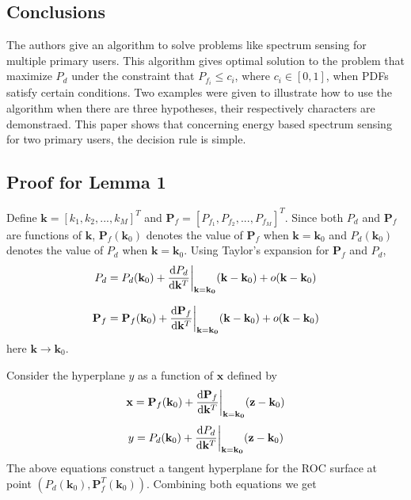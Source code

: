 \documentclass[12pt,journal,a4paper,twoside,onecolumn]{IEEEtran}
\begin{document}
\begin{spacing}{2.5}
\section{Conclusions}
The authors give an algorithm to solve problems like spectrum sensing for multiple primary users.
This algorithm gives optimal solution to the problem that maximize $P_d$ under the constraint that $P_{f_i} \leq c_i$, where $c_i \in [0, 1]$, when PDFs satisfy certain conditions.
Two examples were given to illustrate how to use the algorithm when there are three hypotheses, their respectively characters are demonstraed.
This paper shows that concerning energy based spectrum sensing for two primary users, the decision rule is simple.


\appendix
\subsection{Proof for Lemma 1}

Define $\mathbf{k} = [k_1, k_2, ..., k_M]^T$ and $\mathbf{P}_f = [P_{f_1}, P_{f_2}, ..., P_{f_M}]^T$. Since both $P_d$ and $\mathbf{P}_f$ are functions of $\mathbf{k}$, $\mathbf{P}_f(\mathbf{k}_0)$ denotes the value of $\mathbf{P}_f$ when $\mathbf{k} = \mathbf{k}_0$ and $P_d(\mathbf{k}_0)$ denotes the value of $P_d$ when $\mathbf{k} = \mathbf{k}_0$. Using Taylor's expansion for $\mathbf{P}_f$ and $P_d$,
\begin{equation}
\label{pro: pd}
P_d = P_d(\mathbf{k}_0) + \frac{\mathrm{d}P_d}{\mathrm{d}\mathbf{k}^T}\bigg{|}_{\mathbf{k}=\mathbf{k_0}}(\mathbf{k} - \mathbf{k}_0)
+ o(\mathbf{k} - \mathbf{k}_0)
\end{equation}

\begin{equation}
\label{pro: pf}
\mathbf{P}_f = \mathbf{P}_f(\mathbf{k}_0) + \frac{\mathrm{d}\mathbf{P}_f}{\mathrm{d}\mathbf{k}^T}\bigg{|}_{\mathbf{k}=\mathbf{k_0}}(\mathbf{k} - \mathbf{k}_0)
+ o(\mathbf{k} - \mathbf{k}_0)
\end{equation}
here $\mathbf{k} \rightarrow \mathbf{k}_0$.

Consider the hyperplane $y$ as a function of $\mathbf{x}$ defined by
\begin{equation}
\label{pro: x}
\mathbf{x} = \mathbf{P}_f(\mathbf{k}_0) + \frac{\mathrm{d}\mathbf{P}_f}{\mathrm{d}\mathbf{k}^T}\bigg{|}_{\mathbf{k}=\mathbf{k_0}}(\mathbf{z} - \mathbf{k}_0)
\end{equation}
\begin{equation}
\label{pro: y}
y = P_d(\mathbf{k}_0) + \frac{\mathrm{d}P_d}{\mathrm{d}\mathbf{k}^T}\bigg{|}_{\mathbf{k}=\mathbf{k_0}}(\mathbf{z} - \mathbf{k}_0)
\end{equation}
The above equations construct a tangent hyperplane for the ROC surface at point $(P_d(\mathbf{k}_0), \mathbf{P}_f^T(\mathbf{k}_0))$. Combining both equations  we get


\end{spacing}
\end{document}

